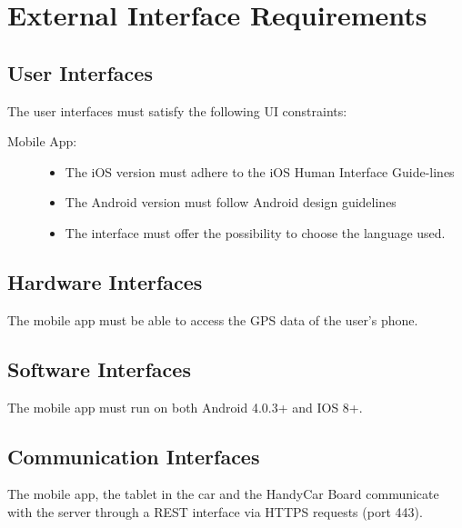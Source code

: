\section{External Interface Requirements}

\subsection{User Interfaces}
The user interfaces must satisfy the following UI constraints:
\begin{description}
\item[Mobile App:]
	\begin{itemize}
	\item The iOS version must adhere to the iOS Human Interface Guide-lines
	\item The Android version must follow Android design guidelines
	\item The interface must offer the possibility to choose the language used.
	\end{itemize}
\end{description}

\subsection{Hardware Interfaces}
The mobile app must be able to access the GPS data of the user’s phone.
\subsection{Software Interfaces}
The mobile app must run on both Android 4.0.3+ and IOS 8+.
\subsection{Communication Interfaces}
The mobile app, the tablet in the car and the HandyCar Board communicate with the server through a REST interface via HTTPS requests (port 443).
